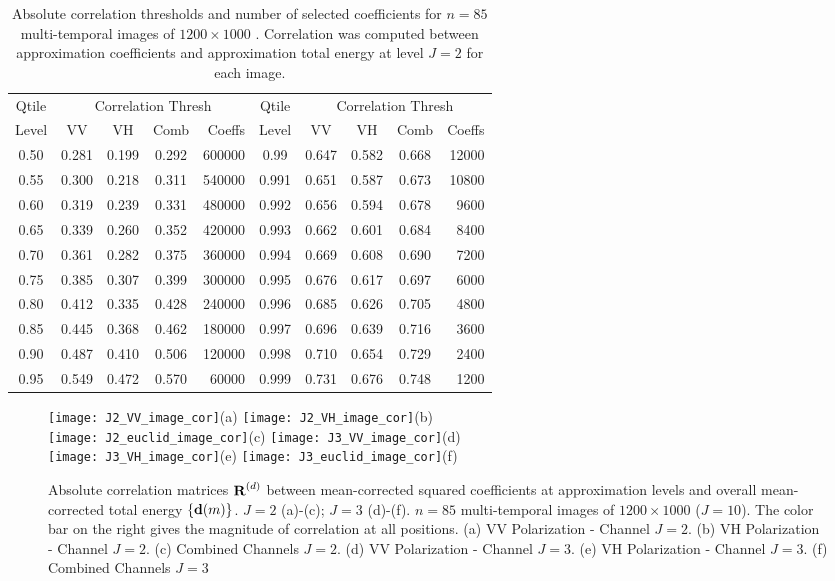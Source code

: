 \documentclass[journal]{IEEEtran}
\newcommand{\vd}{{\textbf d}}
\newcommand{\vR}{{\textbf R}}
\begin{document}
\begin{table*}[ht!]
\caption{Absolute correlation thresholds and number of selected coefficients for $n=85$ multi-temporal images of $1200\times 1000$ . Correlation was computed between approximation coefficients and approximation total energy at level $J=2$ for each image. }\label{tabela_quantis}
\centering
\begin{tabular}{c|cccr||c|cccr}
\hline
Qtile &\multicolumn{4}{c||}{\sc Correlation Thresh} &Qtile & \multicolumn{4}{c}{\sc Correlation Thresh}  \\
Level &VV&VH&Comb& Coeffs &Level &VV&VH&Comb& Coeffs \\
\hline
0.50&0.281&0.199&0.292&600000&0.99&0.647&0.582&0.668&12000\\
0.55&0.300&0.218&0.311&540000&0.991&0.651&0.587&0.673&10800\\
0.60&0.319&0.239&0.331&480000& 0.992&0.656&0.594&0.678&9600\\
0.65&0.339&0.260&0.352&420000& 0.993&0.662&0.601&0.684&8400\\
0.70&0.361&0.282&0.375&360000& 0.994&0.669&0.608&0.690&7200\\
0.75&0.385&0.307&0.399&300000& 0.995&0.676&0.617&0.697&6000\\
0.80&0.412&0.335&0.428&240000& 0.996&0.685&0.626&0.705&4800\\
0.85&0.445&0.368&0.462&180000& 0.997&0.696&0.639&0.716&3600\\
0.90&0.487&0.410&0.506&120000& 0.998&0.710&0.654&0.729&2400\\
0.95&0.549&0.472&0.570&60000& 0.999&0.731&0.676&0.748&1200\\
\hline
\end{tabular}
\end{table*}


\begin{figure}[htp!]
\texttt{[image: J2\_VV\_image\_cor]}(a)
\texttt{[image: J2\_VH\_image\_cor]}(b)\\
\texttt{[image: J2\_euclid\_image\_cor]}(c)
\texttt{[image: J3\_VV\_image\_cor]}(d)\\ 
\texttt{[image: J3\_VH\_image\_cor]}(e)
\texttt{[image: J3\_euclid\_image\_cor]}(f)

\caption{Absolute correlation matrices $\vR^{(d)}$ between mean-corrected squared coefficients at approximation levels and overall mean-corrected total energy $\{\vd(m)\}$.  $J=2$ (a)-(c);  $J=3$ (d)-(f). $n=85$ multi-temporal images of $1200\times 1000$ ($J=10$). The color bar on the right gives the magnitude of correlation at all positions. (a) {\sc VV  Polarization - Channel} $J=2$. (b) {\sc VH  Polarization - Channel} $J=2$. (c) {\sc Combined Channels} $J=2$.  (d)  {\sc VV  Polarization - Channel} $J=3$. (e) {\sc VH  Polarization - Channel} $J=3$. (f) {\sc Combined Channels} $J=3$} 
\label{F:image_corr_J2J3}
\end{figure}
\end{document}
